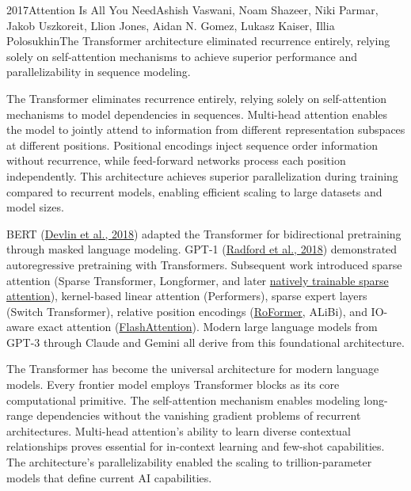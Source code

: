 
\begin{papersummary}{2017}{Attention Is All You Need}{Ashish Vaswani, Noam Shazeer, Niki Parmar, Jakob Uszkoreit, Llion Jones, Aidan N. Gomez, Lukasz Kaiser, Illia Polosukhin}{The Transformer architecture eliminated recurrence entirely, relying solely on self-attention mechanisms to achieve superior performance and parallelizability in sequence modeling.}

The Transformer eliminates recurrence entirely, relying solely on self-attention mechanisms to model dependencies in sequences. Multi-head attention enables the model to jointly attend to information from different representation subspaces at different positions. Positional encodings inject sequence order information without recurrence, while feed-forward networks process each position independently. This architecture achieves superior parallelization during training compared to recurrent models, enabling efficient scaling to large datasets and model sizes.

BERT (\hyperref[paper:devlin-2018]{Devlin et al., 2018}) adapted the Transformer for bidirectional pretraining through masked language modeling. GPT-1 (\hyperref[paper:radford-2018]{Radford et al., 2018}) demonstrated autoregressive pretraining with Transformers. Subsequent work introduced sparse attention (Sparse Transformer, Longformer, and later \hyperref[paper:yuan-2025-nsa]{natively trainable sparse attention}), kernel-based linear attention (Performers), sparse expert layers (Switch Transformer), relative position encodings (\hyperref[paper:su-2021]{RoFormer}, ALiBi), and IO-aware exact attention (\hyperref[paper:dao-2022]{FlashAttention}). Modern large language models from GPT-3 through Claude and Gemini all derive from this foundational architecture.

The Transformer has become the universal architecture for modern language models. Every frontier model employs Transformer blocks as its core computational primitive. The self-attention mechanism enables modeling long-range dependencies without the vanishing gradient problems of recurrent architectures. Multi-head attention's ability to learn diverse contextual relationships proves essential for in-context learning and few-shot capabilities. The architecture's parallelizability enabled the scaling to trillion-parameter models that define current AI capabilities.

\end{papersummary}
